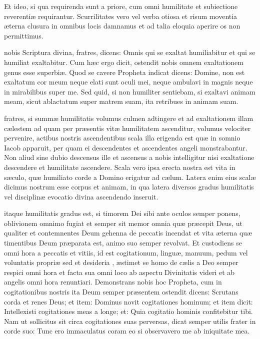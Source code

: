 \documentclass[fontsize=9pt,paper=A6,twoside,BCOR=1mm,DIV=22,headinclude]{scrarticle}
\begin{document}
\begin{multicols}{2}
Et ideo, si qua requirenda sunt a priore, cum omni humilitate et subiectione reverentiæ requirantur. Scurrilitates vero vel verba otiosa et risum moventia æterna clusura in omnibus locis damnamus et ad talia eloquia aperire os non permittimus. 

{
 nobis Scriptura divina, fratres, dicens: Omnis qui se exaltat humiliabitur et qui se humiliat exaltabitur. Cum hæc ergo dicit, ostendit nobis omnem exaltationem genus esse superbiæ. Quod se cavere Propheta indicat dicens: Domine, non est exaltatum cor meum neque elati sunt oculi mei, neque ambulavi in magnis neque in mirabilibus super me. Sed quid, si non humiliter sentiebam, si exaltavi animam meam, sicut ablactatum super matrem suam, ita retribues in animam suam.

 fratres, si summæ humilitatis volumus culmen adtingere et ad exaltationem illam cælestem ad quam per præsentis vitæ humilitatem ascenditur, volumus velociter pervenire, actibus nostris ascendentibus scala illa erigenda est quæ in somnio Iacob apparuit, per quam ei descendentes et ascendentes angeli monstrabantur. Non aliud sine dubio descensus ille et ascensus a nobis intelligitur nisi exaltatione descendere et humilitate ascendere. Scala vero ipsa erecta nostra est vita in sæculo, quæ humiliato corde a Domino erigatur ad cælum. Latera enim eius scalæ dicimus nostrum esse corpus et animam, in qua latera diversos gradus humilitatis vel disciplinæ evocatio divina ascendendo inseruit. 

 itaque humilitatis gradus est, si timorem Dei sibi ante oculos semper ponens, oblivionem omnimo fugiat et semper sit memor omnia quæ præcepit Deus, ut qualiter et contemnentes Deum gehenna de peccatis incendat et vita æterna quæ timentibus Deum præparata est, animo suo semper revolvat. Et custodiens se omni hora a peccatis et vitiis, id est cogitationum, linguæ, manuum, pedum vel voluntatis propriæ sed et desideria , æstimet se homo de cælis a Deo semper respici omni hora et facta sua omni loco ab aspectu Divinitatis videri et ab angelis omni hora renuntiari. Demonstrans nobis hoc Propheta, cum in cogitationibus nostris ita Deum semper præsentem ostendit dicens: Scrutans corda et renes Deus; et item: Dominus novit cogitationes hominum; et item dicit: Intellexisti cogitationes meas a longe; et: Quia cogitatio hominis confitebitur tibi. Nam ut sollicitus sit circa cogitationes suas perversas, dicat semper utilis frater in corde suo: Tunc ero immaculatus coram eo si observavero me ab iniquitate mea.

}
\end{multicols}
\end{document}
